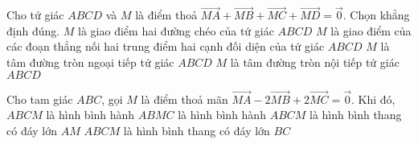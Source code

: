\begin{ex}%
	Cho tứ giác $ABCD$ và $M$ là điểm thoả $\overrightarrow{MA}+\overrightarrow{MB}+\overrightarrow{MC}+\overrightarrow{MD}=\overrightarrow{0}$. Chọn khẳng định đúng.
	\choice
	{$M$ là giao điểm hai đường chéo của tứ giác $ABCD$}
	{\True $M$ là giao điểm của các đoạn thẳng nối hai trung điểm hai cạnh đối diện của tứ giác $ABCD$}
	{$M$ là tâm đường tròn ngoại tiếp tứ giác $ABCD$}
	{$M$ là tâm đường tròn nội tiếp tứ giác $ABCD$}
\end{ex}

\begin{ex}%
	Cho tam giác $ABC$, gọi $M$ là điểm thoả mãn $\overrightarrow{MA}-2\overrightarrow{MB}+2\overrightarrow{MC}=\overrightarrow{0}$. Khi đó,
	\choice
	{$ABCM$ là hình bình hành}
	{$ABMC$ là hình bình hành}
	{\True $ABCM$ là hình bình thang có đáy lớn $AM$}
	{$ABCM$ là hình bình thang có đáy lớn $BC$}
\end{ex}

